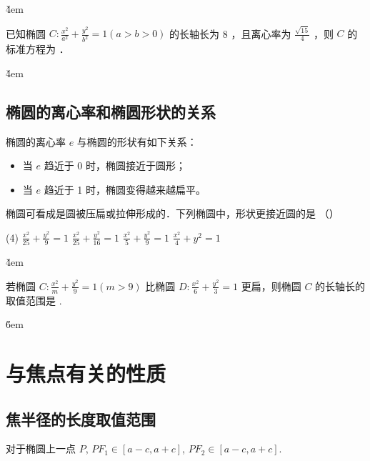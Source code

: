 \v{4em}

\begin{example}
    已知椭圆 $C: \frac{x^2}{a^2}+\frac{y^2}{b^2}=1(a>b>0)$ 的长轴长为 8 ，且离心率为 $\frac{\sqrt{15}}{4}$ ，则 $C$ 的标准方程为 \underline{\qquad}．
\end{example}

\v{4em}

\subsection{椭圆的离心率和椭圆形状的关系}

\begin{theorem}[椭圆的形状]
    椭圆的离心率 $e$ 与椭圆的形状有如下关系：
    \begin{itemize}
        \item 当 $e$ 趋近于 0 时，椭圆接近于圆形；
        \item 当 $e$ 趋近于 1 时，椭圆变得越来越扁平。
    \end{itemize}
\end{theorem}

\begin{example}
    椭圆可看成是圆被压扁或拉伸形成的．下列椭圆中，形状更接近圆的是 （\qquad）
    \begin{tasks}(4)
        \task $\frac{x^2}{25}+\frac{y^2}{9}=1$
        \task $\frac{x^2}{25}+\frac{y^2}{16}=1$
        \task $\frac{x^2}{5}+\frac{y^2}{9}=1$
        \task $\frac{x^2}{4}+y^2=1$
    \end{tasks}
\end{example}

\v{4em}

\begin{example}
    若椭圆 $C: \frac{x^2}{m}+\frac{y^2}{9}=1(m>9)$ 比椭圆 $D: \frac{x^2}{6}+\frac{y^2}{3}=1$ 更扁，则椭圆 $C$ 的长轴长的取值范围是 \underline{\qquad}.
\end{example}

\v{6em}

\section{与焦点有关的性质}

\subsection{焦半径的长度取值范围}

\begin{theorem}
    对于椭圆上一点 $P$, $PF_1 \in [a-c, a+c]$, $PF_2 \in [a-c, a+c]$.
\end{theorem}

